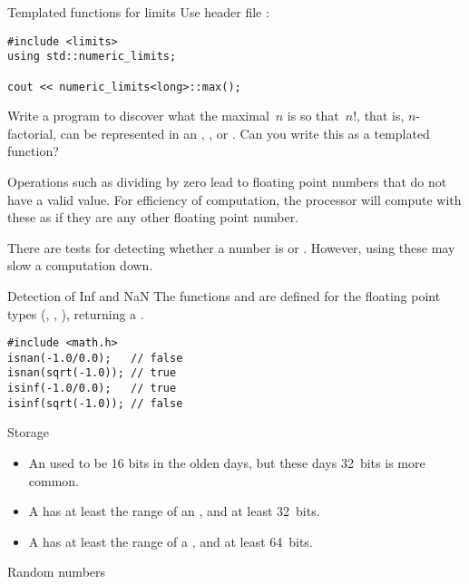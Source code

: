 \begin{block}{Templated functions for limits}
  \label{sl:stl-limits}
  Use header file :
\begin{lstlisting}
#include <limits>
using std::numeric_limits;

cout << numeric_limits<long>::max();
\end{lstlisting}
\end{block}

\begin{exercise}
  \label{ex:big-factorial}
  Write a program to discover what the maximal~$n$ is so that~$n!$,
  that is, $n$-factorial, can be represented in an , ,
  or . Can you write this as a templated function?
\end{exercise}

Operations such as dividing by zero lead to floating point numbers
that do not have a valid value. For efficiency of computation, the
processor will compute with these as if they are any other floating
point number.

There are tests for detecting whether a number is  or
. However, using these may slow a computation down.

\begin{block}{Detection of Inf and NaN}
  The functions  and  are
  defined for the floating point types (, , ), returning a .
\begin{lstlisting}
#include <math.h>
isnan(-1.0/0.0);   // false
isnan(sqrt(-1.0)); // true
isinf(-1.0/0.0);   // true
isinf(sqrt(-1.0)); // false
\end{lstlisting}
\end{block}

 {Storage}

\begin{itemize}
\item An  used to be 16 bits in the olden days, but these days
  32~bits is more common.
\item A  has at least the range of an
  , and at least 32~bits.
\item A  has at least the
  range of a , and at least 64~bits.
\end{itemize}

 {Random numbers}
\label{sec:stl:random}

